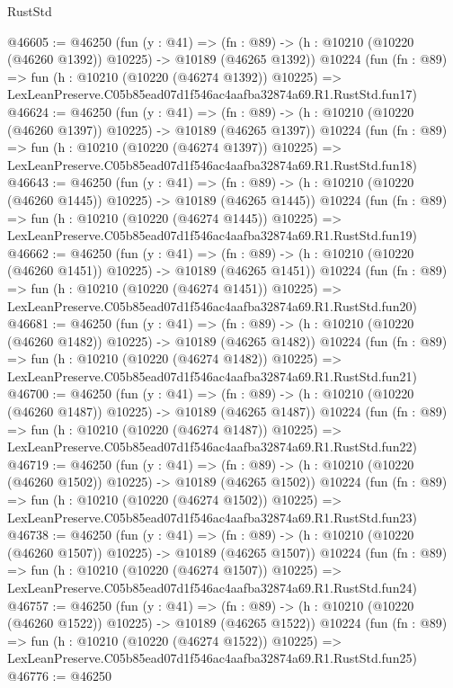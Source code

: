 \begin{lexlean}{RustStd}
\begin{coremodule}
@46605 := @46250
    (fun (y : @41) =>
    (fn : @89) -> (h : @10210 (@10220 (@46260 @1392)) @10225) -> @10189 (@46265 @1392))
    @10224
    (fun (fn : @89) =>
    fun (h : @10210 (@10220 (@46274 @1392)) @10225) =>
    LexLeanPreserve.C05b85ead07d1f546ac4aafba32874a69.R1.RustStd.fun17)
@46624 := @46250
    (fun (y : @41) =>
    (fn : @89) -> (h : @10210 (@10220 (@46260 @1397)) @10225) -> @10189 (@46265 @1397))
    @10224
    (fun (fn : @89) =>
    fun (h : @10210 (@10220 (@46274 @1397)) @10225) =>
    LexLeanPreserve.C05b85ead07d1f546ac4aafba32874a69.R1.RustStd.fun18)
@46643 := @46250
    (fun (y : @41) =>
    (fn : @89) -> (h : @10210 (@10220 (@46260 @1445)) @10225) -> @10189 (@46265 @1445))
    @10224
    (fun (fn : @89) =>
    fun (h : @10210 (@10220 (@46274 @1445)) @10225) =>
    LexLeanPreserve.C05b85ead07d1f546ac4aafba32874a69.R1.RustStd.fun19)
@46662 := @46250
    (fun (y : @41) =>
    (fn : @89) -> (h : @10210 (@10220 (@46260 @1451)) @10225) -> @10189 (@46265 @1451))
    @10224
    (fun (fn : @89) =>
    fun (h : @10210 (@10220 (@46274 @1451)) @10225) =>
    LexLeanPreserve.C05b85ead07d1f546ac4aafba32874a69.R1.RustStd.fun20)
@46681 := @46250
    (fun (y : @41) =>
    (fn : @89) -> (h : @10210 (@10220 (@46260 @1482)) @10225) -> @10189 (@46265 @1482))
    @10224
    (fun (fn : @89) =>
    fun (h : @10210 (@10220 (@46274 @1482)) @10225) =>
    LexLeanPreserve.C05b85ead07d1f546ac4aafba32874a69.R1.RustStd.fun21)
@46700 := @46250
    (fun (y : @41) =>
    (fn : @89) -> (h : @10210 (@10220 (@46260 @1487)) @10225) -> @10189 (@46265 @1487))
    @10224
    (fun (fn : @89) =>
    fun (h : @10210 (@10220 (@46274 @1487)) @10225) =>
    LexLeanPreserve.C05b85ead07d1f546ac4aafba32874a69.R1.RustStd.fun22)
@46719 := @46250
    (fun (y : @41) =>
    (fn : @89) -> (h : @10210 (@10220 (@46260 @1502)) @10225) -> @10189 (@46265 @1502))
    @10224
    (fun (fn : @89) =>
    fun (h : @10210 (@10220 (@46274 @1502)) @10225) =>
    LexLeanPreserve.C05b85ead07d1f546ac4aafba32874a69.R1.RustStd.fun23)
@46738 := @46250
    (fun (y : @41) =>
    (fn : @89) -> (h : @10210 (@10220 (@46260 @1507)) @10225) -> @10189 (@46265 @1507))
    @10224
    (fun (fn : @89) =>
    fun (h : @10210 (@10220 (@46274 @1507)) @10225) =>
    LexLeanPreserve.C05b85ead07d1f546ac4aafba32874a69.R1.RustStd.fun24)
@46757 := @46250
    (fun (y : @41) =>
    (fn : @89) -> (h : @10210 (@10220 (@46260 @1522)) @10225) -> @10189 (@46265 @1522))
    @10224
    (fun (fn : @89) =>
    fun (h : @10210 (@10220 (@46274 @1522)) @10225) =>
    LexLeanPreserve.C05b85ead07d1f546ac4aafba32874a69.R1.RustStd.fun25)
@46776 := @46250

\end{coremodule}
\end{lexlean}
